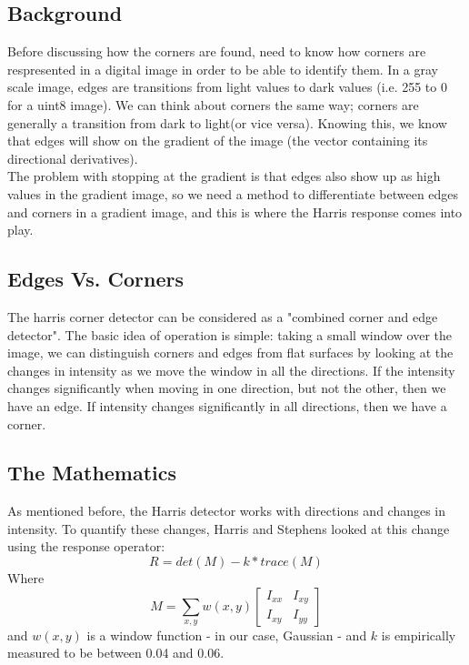 \documentclass[10pt,twocolumn,letterpaper]{article}
\begin{document}
\subsection{Background}

Before discussing how the corners are found, need to know how corners are respresented in a digital image in order to be able to identify them. In a gray scale image, edges are transitions from light values to dark values (i.e. 255 to 0 for a uint8 image). We can think about corners the same way; corners are generally a transition from dark to light(or vice versa). Knowing this, we know that edges will show on the gradient of the image (the vector containing its directional derivatives).\\
The problem with stopping at the gradient is that edges also show up as high values in the gradient image, so we need a method to differentiate between edges and corners in a gradient image, and this is where the Harris response comes into play.

\subsection{Edges Vs. Corners}

The harris corner detector can be considered as a "combined corner and edge detector". The basic idea of operation is simple: taking a small window over the image, we can distinguish corners and edges from flat surfaces by looking at the changes in intensity as we move the window in all the directions. If the intensity changes significantly when moving in one direction, but not the other, then we have an edge. If intensity changes significantly in all directions, then we have a corner.

\subsection{The Mathematics}
As mentioned before, the Harris detector works with directions and changes in intensity. To quantify these changes, Harris and Stephens looked at this change using the response operator:
\begin{equation}
R = det(M) - k *trace(M)
\end{equation}
Where
\[M = \sum_{x,y} w(x,y) \begin{bmatrix}
I_{xx} & I_{xy}\\
I_{xy} & I_{yy}
\end{bmatrix}\]
and $w(x,y)$ is a window function - in our case, Gaussian - and $k$ is empirically measured to be between 0.04 and 0.06.\\
\end{document}
